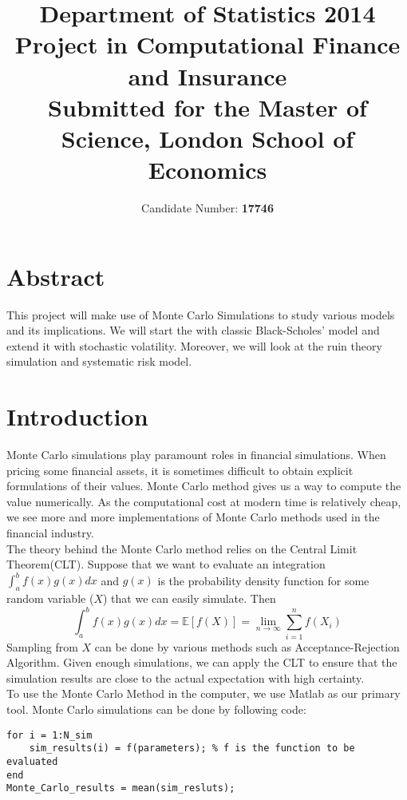 \documentclass[a4paper,11pt]{article}
\begin{document}
\title{Department of Statistics 2014\\ {\bf Project in Computational Finance and Insurance}\\ {\small Submitted for the Master of Science, London School of Economics} }
\author{Candidate Number: \bf 17746}
\maketitle
\vfill
\section*{Abstract}
This project will make use of Monte Carlo Simulations to study various models and its implications. We will start the with classic Black-Scholes' model and extend it  with stochastic volatility. Moreover, we will look at the ruin theory simulation and systematic risk model.
\newpage

\tableofcontents
\newpage
\section{Introduction}
Monte Carlo simulations play paramount roles in financial simulations. When pricing some financial assets, it is sometimes difficult to obtain explicit formulations of their values. Monte Carlo method gives us a way to compute the value numerically. As the computational cost at modern time is relatively cheap, we see more and more implementations of Monte Carlo methods used in the financial industry.\\

The theory behind the Monte Carlo method relies on the Central Limit Theorem(CLT). Suppose that we want to evaluate an integration $\int_a^bf(x)g(x)dx$ and $g(x)$ is the probability density function for some random variable ($X$) that we can easily simulate. Then $$\int_a^bf(x)g(x)dx = \mathbb{E}[f(X)] = \lim_{n\to \infty}\sum_{i = 1}^nf(X_i)$$
Sampling from $X$ can be done by various methods such as \cite{Neumann1951} Acceptance-Rejection Algorithm. Given enough simulations, we can apply the CLT to ensure that the simulation results are close to the actual expectation with high certainty.\\

To use the Monte Carlo Method in the computer, we use Matlab as our primary tool. Monte Carlo simulations can be done by following code:

\begin{lstlisting}
for i = 1:N_sim
	sim_results(i) = f(parameters); % f is the function to be evaluated
end
Monte_Carlo_results = mean(sim_resluts);
\end{lstlisting}
\end{document}
